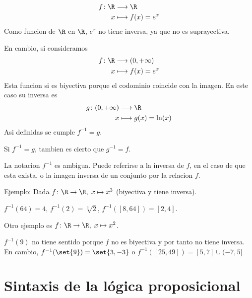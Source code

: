 \begin{remark}
	\[
		\begin{aligned}
			f \colon \R & \longrightarrow \R          \\
			x           & \longmapsto f (x ) = e^{x }
		\end{aligned}
	\]
	Como funcion de \(\R \) en \(\R \), \(e^{x } \) no tiene inversa, ya que no es suprayectiva.

	En cambio, si consideramos
	\[
		\begin{aligned}
			f \colon \R & \longrightarrow (0,+\infty ) \\
			x           & \longmapsto f (x ) =e^{x}
		\end{aligned}
	\]
	Esta funcion si es biyectiva porque el codominio coincide con la imagen. En este caso su inversa es
	\[
		\begin{aligned}
			g \colon (0,+\infty) & \longrightarrow \R            \\
			x                    & \longmapsto g (x ) = \ln (x )
		\end{aligned}
	\]
	Asi definidas se cumple \(f^{-1} = g \).
\end{remark}
\begin{remark}
	Si \(f^{-1} = g \), tambien es cierto que \(g^{-1} = f \).
\end{remark}
\begin{remark}
	La notacion \(f^{-1}  \) es ambigua. Puede referirse a la inversa de \(f \), en el caso de que esta exista, o la imagen inversa de un conjunto por la relacion \(f \).

	Ejemplo: Dada \(f \colon  \R \to \R, \; x \mapsto x^{3 } \) (biyectiva y tiene inversa).

	\(f^{-1}(64) = 4\), \(f^{-1} (2) = \sqrt[3]{2} \), \(f^{-1} ([8,64]) = [2,4]\).

	\vspace{0.2cm}
	Otro ejemplo es \(f \colon \R \to \R, \; x \mapsto x^{2 } \).

	\(f^{-1} (9 )\) no tiene sentido porque \(f\) no es biyectiva y por tanto no tiene inversa. En cambio, \(f^{-1} (\set{9}) = \set{3,-3}\) o \(f^{-1} ([25,49]) = [5,7] \cup (-7,5]\)
\end{remark}

\part{Sintaxis de la lógica proposicional}
